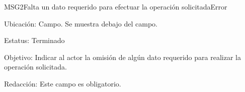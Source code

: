 %

\begin{mensaje}{MSG2}{Falta un dato requerido para efectuar la operación solicitada}{Error}
    \item[Ubicación:] Campo. Se muestra debajo del campo.
    \item[Estatus:] Terminado
    \item[Objetivo:] Indicar al actor la omisión de algún dato requerido para realizar la operación solicitada.
    \item[Redacción:] Este campo es obligatorio.
\end{mensaje}

